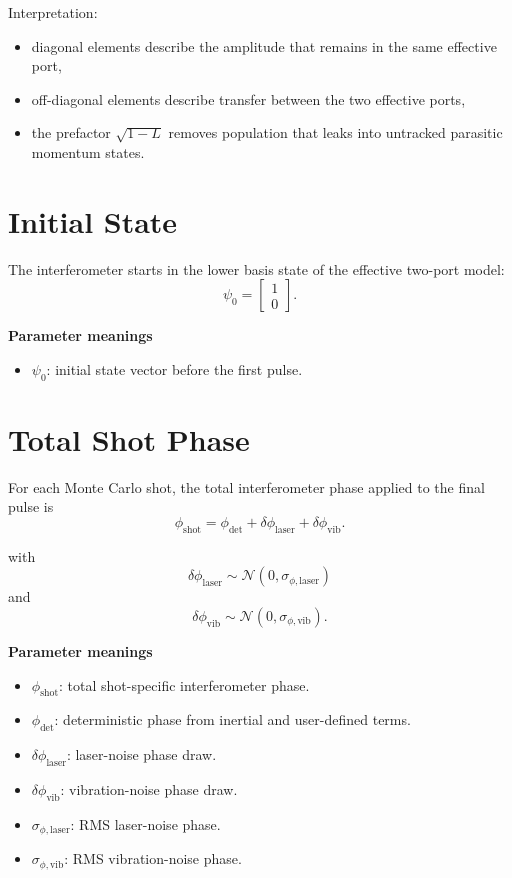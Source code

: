 \documentclass[11pt,a4paper]{article}
\begin{document}
Interpretation:
\begin{itemize}[leftmargin=1.5em]
  \item diagonal elements describe the amplitude that remains in the same effective port,
  \item off-diagonal elements describe transfer between the two effective ports,
  \item the prefactor $\sqrt{1-L}$ removes population that leaks into untracked parasitic momentum states.
\end{itemize}

\section{Initial State}

The interferometer starts in the lower basis state of the effective two-port model:
\begin{equation}
  \psi_0 =
  \begin{bmatrix}
    1 \\
    0
  \end{bmatrix}.
\end{equation}

\textbf{Parameter meanings}
\begin{itemize}[leftmargin=1.5em]
  \item $\psi_0$: initial state vector before the first pulse.
\end{itemize}

\section{Total Shot Phase}

For each Monte Carlo shot, the total interferometer phase applied to the final pulse is
\begin{equation}
  \phi_{\mathrm{shot}} =
  \phi_{\mathrm{det}}
  + \delta\phi_{\mathrm{laser}}
  + \delta\phi_{\mathrm{vib}}.
\end{equation}

with
\begin{equation}
  \delta\phi_{\mathrm{laser}} \sim \mathcal{N}(0,\sigma_{\phi,\mathrm{laser}})
\end{equation}
and
\begin{equation}
  \delta\phi_{\mathrm{vib}} \sim \mathcal{N}(0,\sigma_{\phi,\mathrm{vib}}).
\end{equation}

\textbf{Parameter meanings}
\begin{itemize}[leftmargin=1.5em]
  \item $\phi_{\mathrm{shot}}$: total shot-specific interferometer phase.
  \item $\phi_{\mathrm{det}}$: deterministic phase from inertial and user-defined terms.
  \item $\delta\phi_{\mathrm{laser}}$: laser-noise phase draw.
  \item $\delta\phi_{\mathrm{vib}}$: vibration-noise phase draw.
  \item $\sigma_{\phi,\mathrm{laser}}$: RMS laser-noise phase.
  \item $\sigma_{\phi,\mathrm{vib}}$: RMS vibration-noise phase.
\end{itemize}
\end{document}
